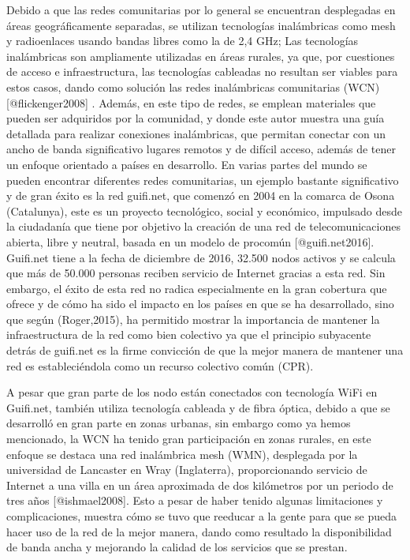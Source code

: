 \documentclass[]{article}
\begin{document}
Debido a que las redes comunitarias por lo general se encuentran
desplegadas en áreas geográficamente separadas, se utilizan tecnologías
inalámbricas como mesh y radioenlaces usando bandas libres como la de
2,4 GHz; Las tecnologías inalámbricas son ampliamente utilizadas en
áreas rurales, ya que, por cuestiones de acceso e infraestructura, las
tecnologías cableadas no resultan ser viables para estos casos, dando
como solución las redes inalámbricas comunitarias (WCN)
{[}@flickenger2008{]} . Además, en este tipo de redes, se emplean
materiales que pueden ser adquiridos por la comunidad, y donde este
autor muestra una guía detallada para realizar conexiones inalámbricas,
que permitan conectar con un ancho de banda significativo lugares
remotos y de difícil acceso, además de tener un enfoque orientado a
países en desarrollo. En varias partes del mundo se pueden encontrar
diferentes redes comunitarias, un ejemplo bastante significativo y de
gran éxito es la red guifi.net, que comenzó en 2004 en la comarca de
Osona (Catalunya), este es un proyecto tecnológico, social y económico,
impulsado desde la ciudadanía que tiene por objetivo la creación de una
red de telecomunicaciones abierta, libre y neutral, basada en un modelo
de procomún {[}@guifi.net2016{]}. Guifi.net tiene a la fecha de
diciembre de 2016, 32.500 nodos activos y se calcula que más de 50.000
personas reciben servicio de Internet gracias a esta red. Sin embargo,
el éxito de esta red no radica especialmente en la gran cobertura que
ofrece y de cómo ha sido el impacto en los países en que se ha
desarrollado, sino que según (Roger,2015), ha permitido mostrar la
importancia de mantener la infraestructura de la red como bien colectivo
ya que el principio subyacente detrás de guifi.net es la firme
convicción de que la mejor manera de mantener una red es estableciéndola
como un recurso colectivo común (CPR).

A pesar que gran parte de los nodo están conectados con tecnología WiFi
en Guifi.net, también utiliza tecnología cableada y de fibra óptica,
debido a que se desarrolló en gran parte en zonas urbanas, sin embargo
como ya hemos mencionado, la WCN ha tenido gran participación en zonas
rurales, en este enfoque se destaca una red inalámbrica mesh (WMN),
desplegada por la universidad de Lancaster en Wray (Inglaterra),
proporcionando servicio de Internet a una villa en un área aproximada de
dos kilómetros por un periodo de tres años {[}@ishmael2008{]}. Esto a
pesar de haber tenido algunas limitaciones y complicaciones, muestra
cómo se tuvo que reeducar a la gente para que se pueda hacer uso de la
red de la mejor manera, dando como resultado la disponibilidad de banda
ancha y mejorando la calidad de los servicios que se prestan.
\end{document}
